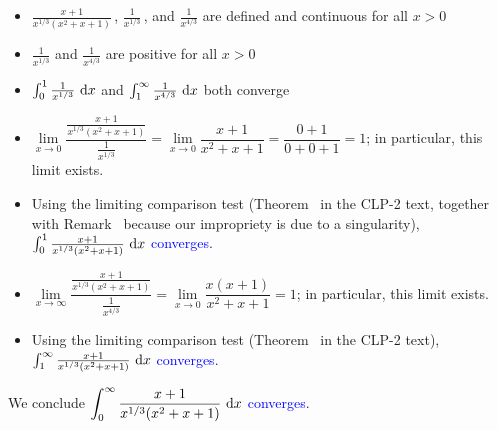 \begin{solution}
\begin{itemize}
\item $\frac{x+1}{x^{1/3}(x^2+x+1)}$\,, $\frac{1}{x^{1/3}}$\,, and $\frac{1}{x^{4/3}}$ are defined and continuous for all $x > 0$
\item $\frac{1}{x^{1/3}}$ and $\frac{1}{x^{4/3}}$ are positive for all $x>0$
\item $\int_0^1  \frac{1}{x^{1/3}}~\mathrm{d}x$ and $\int_1^\infty  \frac{1}{x^{4/3}}~\mathrm{d}x$ both converge
\item $\lim\limits_{x \to 0}\dfrac{\frac{x+1}{x^{1/3}(x^2+x+1)}}{\frac{1}{x^{1/3}}}
=\lim\limits_{x \to 0}\dfrac{x+1}{x^2+x+1}=\dfrac{0+1}{0+0+1}=1
$; in particular, this limit exists.
\item Using the limiting comparison test (Theorem~
 in the CLP-2 text, together with Remark~ because our impropriety is due to a singularity), \textcolor{blue}{
$\int_0^1 \frac{x+1}{x^{1/3}(x^2+x+1)}~\mathrm{d}x$ converges}.
\item $\lim\limits_{x \to \infty}\dfrac{\frac{x+1}{x^{1/3}(x^2+x+1)}}{\frac{1}{x^{4/3}}}
=\lim\limits_{x \to 0}\dfrac{x(x+1)}{x^2+x+1}=1
$; in particular, this limit exists.
\item Using the limiting comparison test (Theorem~
 in the CLP-2 text), \textcolor{blue}{
$\int_1^\infty \frac{x+1}{x^{1/3}(x^2+x+1)}~\mathrm{d}x$ converges}.
\end{itemize}

We conclude \textcolor{blue}{
$\displaystyle\int_0^\infty \frac{x+1}{x^{1/3}(x^2+x+1)}~\mathrm{d}x$ converges}.
\end{solution}



\subsection*{\Application}

